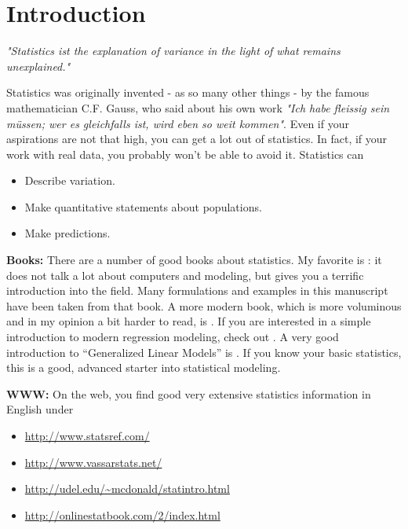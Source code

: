 \chapter{Introduction}

\emph{"Statistics ist the explanation of variance in the light of what remains
unexplained."}

\vspace{5 mm}

Statistics was originally invented - as so many other things - by the famous mathematician C.F. Gauss, who said about his own work \emph{"Ich habe fleissig sein m\"ussen; wer es gleichfalls ist, wird eben so weit kommen"}. Even if your aspirations are not that high, you can get a lot out of statistics. In fact, if your work with real data, you probably won't be able to avoid it. Statistics can

\begin{itemize}
  \item Describe variation.
  \item Make quantitative statements about populations.
  \item Make predictions.
\end{itemize}

\textbf{Books: }There are a number of good books about statistics. My favorite is \cite{altman99}: it does not talk a lot about computers and modeling, but gives you a terrific introduction into the field. Many formulations and examples in this manuscript have been taken from that book. A more modern book, which is more voluminous and in my opinion a bit harder to read, is \cite{Riffenburgh2012}. If you are interested in a simple introduction to modern regression modeling, check out \cite{Kaplan2009}. A very good introduction to “Generalized Linear Models” is \cite{Dobson2008}. If you know your basic statistics, this is a good, advanced starter into statistical modeling.

\vspace{5 mm}

\textbf{WWW: }On the web, you find good very extensive statistics information in English under
\begin{itemize}
    \item \url{http://www.statsref.com/}
    \item \url{http://www.vassarstats.net/}
    \item \url{http://udel.edu/~mcdonald/statintro.html}
    \item \url{http://onlinestatbook.com/2/index.html}
\end{itemize}

